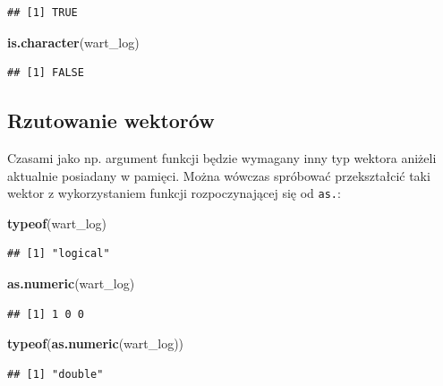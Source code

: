 \documentclass[]{book}
\newenvironment{Shaded}{\begin{snugshade}}{\end{snugshade}}
\newcommand{\KeywordTok}[1]{\textcolor[rgb]{0.13,0.29,0.53}{\textbf{#1}}}
\newcommand{\NormalTok}[1]{#1}
\begin{document}
\begin{verbatim}
## [1] TRUE
\end{verbatim}

\begin{Shaded}
\begin{Highlighting}[]
\KeywordTok{is.character}\NormalTok{(wart_log)}
\end{Highlighting}
\end{Shaded}

\begin{verbatim}
## [1] FALSE
\end{verbatim}

\subsection{Rzutowanie wektorów}\label{rzutowanie-wektorow}

Czasami jako np. argument funkcji będzie wymagany inny typ wektora
aniżeli aktualnie posiadany w pamięci. Można wówczas spróbować
przekształcić taki wektor z wykorzystaniem funkcji rozpoczynającej się
od \texttt{as.}:

\begin{Shaded}
\begin{Highlighting}[]
\KeywordTok{typeof}\NormalTok{(wart_log)}
\end{Highlighting}
\end{Shaded}

\begin{verbatim}
## [1] "logical"
\end{verbatim}

\begin{Shaded}
\begin{Highlighting}[]
\KeywordTok{as.numeric}\NormalTok{(wart_log)}
\end{Highlighting}
\end{Shaded}

\begin{verbatim}
## [1] 1 0 0
\end{verbatim}

\begin{Shaded}
\begin{Highlighting}[]
\KeywordTok{typeof}\NormalTok{(}\KeywordTok{as.numeric}\NormalTok{(wart_log))}
\end{Highlighting}
\end{Shaded}

\begin{verbatim}
## [1] "double"
\end{verbatim}
\end{document}
